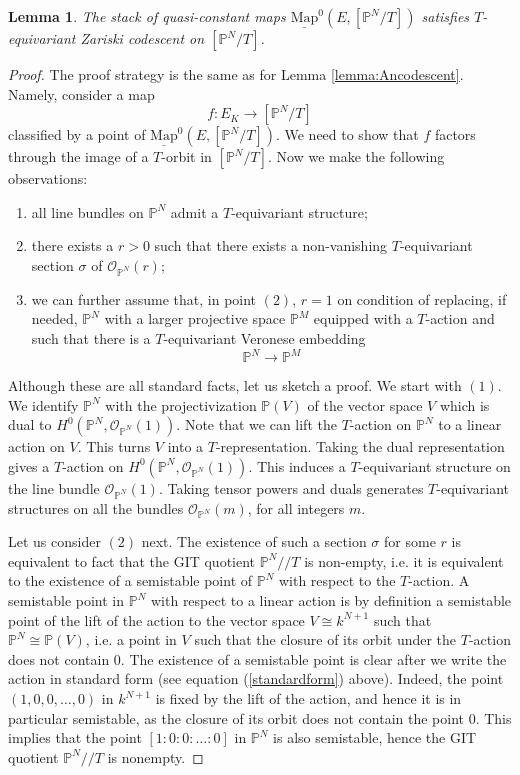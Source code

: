 \documentclass[11pt,letterpaper]{amsart}
\newtheorem{lemma}[dummy]{Lemma}
\newcommand{\bP}{\mathbb{P}}
\newcommand{\cO}{\mathcal{O}}
\newcommand{\Mapo}[2]{\underline{\mathrm{Map}}^{0}\left (#1,#2\right )}
\begin{document}
 
\begin{lemma}\label{lemma:Pncodescent}
The stack of quasi-constant maps $\Mapo{E}{[\mathbb{P}^N/T]}$ satisfies $T$-equivariant Zariski codescent on $[\mathbb{P}^N/T]$.
\end{lemma}
\begin{proof}
The proof strategy is the same as for Lemma \ref{lemma:Ancodescent}. Namely, consider a map $$f:E_K \to [\bP^N/T]$$  classified by a point of 
$\Mapo{E}{[\bP^N/T]}$. 
We need to show that $f$ factors through the image of a $T$-orbit in 
$[\mathbb{P}^N/T]$. Now we make the following observations:
\begin{enumerate}
\item all line bundles on $\mathbb{P}^N$ admit a $T$-equivariant structure;
\item there exists a $r > 0$ such that there exists a non-vanishing $T$-equivariant section $\sigma$ of $\cO_{\mathbb{P}^N}(r)$;
\item we can further assume that, in point $(2)$, $r=1$ on condition of replacing, if needed, $\mathbb{P}^N$ with a larger projective space $\mathbb{P}^M$ equipped with a $T$-action and such that there is a $T$-equivariant Veronese embedding 
$$
\mathbb{P}^N  \to \mathbb{P}^M
$$
\end{enumerate}
Although these are all standard facts, let us sketch a proof. We start with $(1)$. We identify $\mathbb{P}^N$ with the projectivization $\mathbb{P}(V)$ of the vector space $V$ which is  dual to $H^0(\bP^N,\cO_{\bP^N}(1))$. Note that we can lift the $T$-action on $\bP^N$ to a linear action on $V$. This turns $V$ into a $T$-representation. Taking the dual representation gives a  $T$-action on $H^0(\bP^N,\cO_{\bP^N}(1))$.  This induces a $T$-equivariant structure on the line bundle $\cO_{\bP^N}(1)$. Taking tensor powers and duals generates $T$-equivariant structures on all the bundles $\cO_{\bP^N}(m)$, for all integers $m$.

Let us consider $(2)$ next. The existence of such a section $\sigma$ for some $r$ is equivalent to fact that the GIT quotient $\bP^N//T$ is non-empty, i.e. it is equivalent to the existence of a semistable point of $\bP^N$ with respect to the $T$-action. A semistable point in $\bP^N$ with respect to a linear action is by definition a semistable point of the lift of the action to the vector space $V \cong k^{N+1}$ such that 
$\mathbb{P}^N \cong \mathbb{P}(V)$, i.e. a point in $V$ such that the closure of its orbit under the $T$-action does not contain $0$. The existence of a semistable point is clear after we write the action in standard form (see equation (\ref{standardform}) above). Indeed, the point $(1,0,0,\dots,0)$ in $k^{N+1}$ is fixed by the lift of the action, and hence it is in particular  semistable, as the closure of its orbit does not contain the point $0$. This implies that the point $[1:0:0:\dots:0]$ in $\bP^N$ is also semistable, hence the GIT quotient $\bP^N//T$ is nonempty. 


\end{proof}
\end{document}
